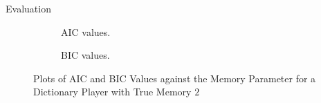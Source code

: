 \documentclass[final]{beamer}
\begin{document}
{\begin{frame}{}
\begin{center}
\begin{columns}[t]
\begin{column}{0.32\textwidth}
\begin{block}{\huge Evaluation}
\vspace{1cm}

\begin{figure}
	\begin{subfigure}[b]{.45\textwidth}
\begin{center}
		\caption{AIC values.}
\end{center}
	\end{subfigure}
\hspace{1cm}
	\begin{subfigure}[b]{.45\textwidth}
\begin{center}
		\caption{BIC values.}
\end{center}
	\end{subfigure}
\hfill
	\caption{Plots of AIC and BIC Values against the Memory Parameter for a Dictionary Player with True Memory $2$}	
\end{figure}
    \end{block}


\end{column}
\end{columns}
\end{center}
\end{frame}}
\end{document}
